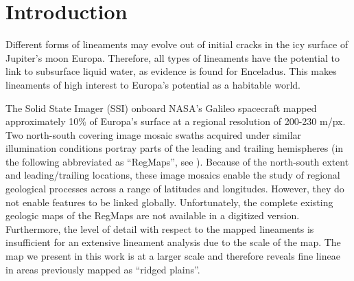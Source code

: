 \section{Introduction} \label{sec:intro}

Different forms of lineaments may evolve out of initial cracks in the icy surface of Jupiter’s moon Europa. Therefore, all types of lineaments have the potential to link to subsurface liquid water, as evidence is found for Enceladus. This makes lineaments of high interest to Europa's potential as a habitable world.



The Solid State Imager (SSI) onboard NASA’s Galileo spacecraft mapped approximately 10\% of Europa’s surface at a regional resolution of 200-230 m/px. Two north-south covering image mosaic swaths acquired under similar illumination conditions portray parts of the leading and trailing hemispheres (in the following abbreviated as ``RegMaps'', see ). Because of the north-south extent and leading/trailing locations, these image mosaics enable the study of regional geological processes across a range of latitudes and longitudes. However, they do not enable features to be linked globally. 
Unfortunately, the complete existing geologic maps of the RegMaps are not available in a digitized version. Furthermore, the level of detail with respect to the mapped lineaments is insufficient for an extensive lineament analysis due to the scale of the map. The map we present in this work is at a larger scale and therefore reveals fine lineae in areas previously mapped as ``ridged plains''.


